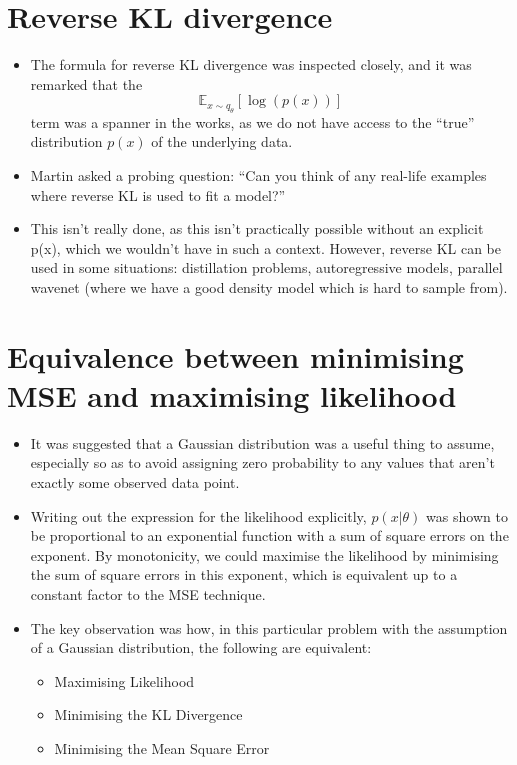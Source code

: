 \documentclass{article}
\begin{document}
\section{Reverse KL divergence}

\begin{itemize}
	\item The formula for reverse KL divergence was inspected closely, and it was remarked that the
	\begin{equation}
	\mathbb{E}_{x \sim q_\theta}[\log (p(x))]
	\end{equation}
	term was a spanner in the works, as we do not have access to the ``true'' distribution $p(x)$ of the underlying	data.

	\item Martin asked a probing question: ``Can you think of any real-life examples where reverse KL is used to fit
	a model?''
	
	\item This isn’t really done, as this isn’t practically possible without an explicit p(x), which we wouldn’t have in such a context. However, reverse KL can be used in some situations: distillation problems, autoregressive models, parallel wavenet (where we have a good density model which is hard to sample from).
\end{itemize}

\section{Equivalence between minimising MSE and maximising likelihood}

\begin{itemize}
	\item It was suggested that a Gaussian distribution was a useful thing to assume, especially so as to avoid	assigning zero probability to any values that aren’t exactly some observed data point.
	
	\item Writing out the expression for the likelihood explicitly, $p(x|\theta)$ was shown to be proportional to an exponential function with a sum of square errors on the exponent. By monotonicity, we could maximise the likelihood by minimising the sum of square errors in this exponent, which is equivalent up to a constant factor to the MSE technique.
	
	\item The key observation was how, in this particular problem with the assumption of a Gaussian distribution,
	the following are equivalent:
	\begin{itemize}
		\item Maximising Likelihood
		\item Minimising the KL Divergence
		\item Minimising the Mean Square Error
	\end{itemize}
\end{itemize}
\end{document}
